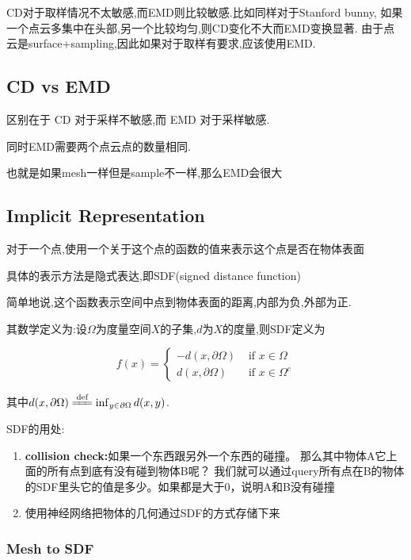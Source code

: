 CD对于取样情况不太敏感,而EMD则比较敏感.比如同样对于Stanford bunny,
如果一个点云多集中在头部,另一个比较均匀,则CD变化不大而EMD变换显著.
由于点云是surface+sampling,因此如果对于取样有要求,应该使用EMD.

\subsection{CD vs EMD}

区别在于 CD 对于采样不敏感,而 EMD 对于采样敏感.

同时EMD需要两个点云点的数量相同.

也就是如果mesh一样但是sample不一样,那么EMD会很大

\subsection{Implicit Representation}

对于一个点,使用一个关于这个点的函数的值来表示这个点是否在物体表面

具体的表示方法是隐式表达,即SDF(signed distance function)

简单地说,这个函数表示空间中点到物体表面的距离,内部为负,外部为正.

其数学定义为:设$\Omega$为度量空间$X$的子集,$d$为$X$的度量,则SDF定义为

\begin{equation}
    f(x)=\begin{cases}
        -d(x, \partial \Omega) & \text { if } x \in \Omega 
        \\
        d(x, \partial \Omega) & \text { if } x \in \Omega^{c}
    \end{cases}
\end{equation}

其中$d(x, \partial \Omega) \xlongequal{\text{def}} \inf_{y \in \partial \Omega} d(x, y)$.

SDF的用处:

\begin{enumerate}
    \item \textbf{collision check:}如果一个东西跟另外一个东西的碰撞。
    那么其中物体A它上面的所有点到底有没有碰到物体B呢？
    我们就可以通过query所有点在B的物体的SDF里头它的值是多少。如果都是大于0，说明A和B没有碰撞
    \item 使用神经网络把物体的几何通过SDF的方式存储下来
\end{enumerate}

\subsubsection{Mesh to SDF}

